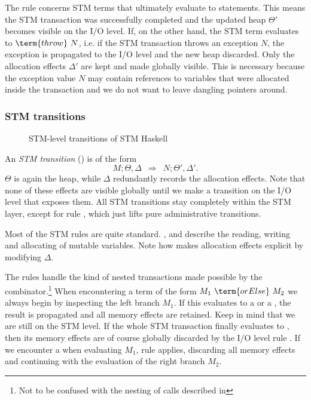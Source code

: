 The rule  concerns STM terms that ultimately evaluate to  statements.
This means the STM transaction was successfully completed and the updated heap $\Theta'$ becomes visible on the I/O level.
%
If, on the other hand, the STM term evaluates to $\term{throw}\ N$, i.e. if the STM transaction throws an exception $N$, the exception is propagated to the I/O level and the new heap discarded.
Only the allocation effects $\Delta'$ are kept and made globally visible.
This is necessary because the exception value $N$ may contain references to variables that were allocated inside the transaction and we do not want to leave dangling pointers around.

\subsubsection{STM transitions}

\begin{figure}

\caption{STM-level transitions of STM Haskell\\ \parencite{harris-et-al-2005}}
\label{fig:orig-stm}
\end{figure}

An \emph{STM transition} () is of the form 
$$M;\Theta,\Delta \enspace\Rightarrow\enspace N;\Theta',\Delta'.$$
$\Theta$ is again the heap, while $\Delta$ redundantly records the allocation effects.
Note that none of these effects are visible globally until we make a transition on the I/O level that exposes them.
All STM transitions stay completely within the STM layer, except for rule , which just lifts pure administrative transitions.

Most of the STM rules are quite standard.
,  and  describe the reading, writing and allocating of mutable variables.
Note how  makes allocation effects explicit by modifying $\Delta$.

The rules  handle the kind of nested transactions made possible by the  combinator.\footnote{Not to be confused with the nesting of  calls described in }
When encountering a term of the form $M_1\ \term{orElse}\ M_2$ we always begin by inspecting the left branch $M_1$.
If this evaluates to a   or a  , the result is propagated and all memory effects are retained.
Keep in mind that we are still on the STM level.
If the whole STM transaction finally evaluates to , then its memory effects are of course globally discarded by the I/O level rule .
If we encounter a  when evaluating $M_1$, rule  applies, discarding all memory effects and continuing with the evaluation of the right branch $M_2$.

